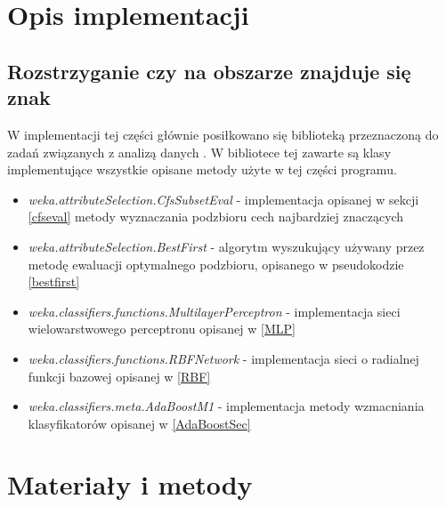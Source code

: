 \documentclass{classrep}
\begin{document}
\section{Opis implementacji}


\subsection{Rozstrzyganie czy na obszarze znajduje się znak}
W implementacji tej części głównie posiłkowano się biblioteką przeznaczoną do zadań związanych z analizą danych \cite{weka}. W bibliotece tej zawarte są klasy implementujące wszystkie opisane metody użyte w tej części programu. 

\begin{itemize}
\item
\textit{\color{blue}weka.attributeSelection.CfsSubsetEval}  - implementacja opisanej w sekcji \ref{cfseval} metody wyznaczania podzbioru cech najbardziej znaczących \\ 
\item
\textit{\color{blue}weka.attributeSelection.BestFirst} - algorytm wyszukujący używany przez metodę ewaluacji optymalnego podzbioru, opisanego w pseudokodzie \ref{bestfirst} \\ 
\item
\textit{\color{blue}weka.classifiers.functions.MultilayerPerceptron} - implementacja sieci wielowarstwowego perceptronu opisanej w  \ref{MLP} \\ 
\item
\textit{\color{blue}weka.classifiers.functions.RBFNetwork} - implementacja sieci o radialnej funkcji bazowej opisanej w \ref{RBF} \\ 
\item
\textit{\color{blue}weka.classifiers.meta.AdaBoostM1} - implementacja metody wzmacniania klasyfikatorów opisanej w \ref{AdaBoostSec} \\ 

\end{itemize}


\section{Materiały i metody}
\end{document}
